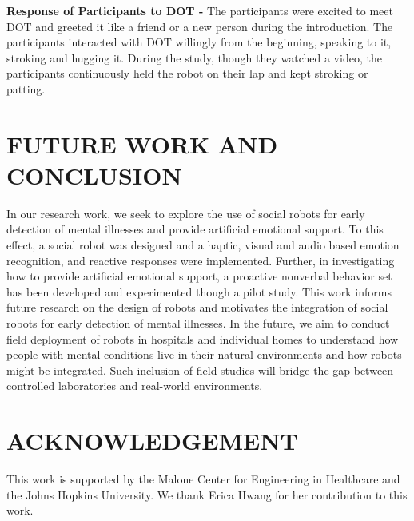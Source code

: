\documentclass[letterpaper, 10 pt, conference]{ieeeconf}  %
\begin{document}
\textbf{Response of Participants to DOT -} The participants were excited to meet DOT and greeted it like a friend or a new person during the introduction. The participants interacted with DOT willingly from the beginning, speaking to it, stroking and hugging it. During the study, though they watched a video, the participants continuously
held the robot on their lap and kept stroking or patting.

\section{FUTURE WORK AND CONCLUSION}

In our research work, we seek to explore the use of social robots for early detection of mental illnesses and provide artificial emotional support. To this effect, a social robot was designed and a haptic, visual and audio based emotion recognition, and reactive responses were implemented. Further, in investigating how to provide artificial emotional support, a proactive nonverbal behavior set has been developed and experimented though a pilot study. This work informs future research on the design of robots and motivates the integration of social robots for early detection of mental illnesses. In the future, we aim to conduct field deployment of robots in hospitals and individual homes to understand how people with mental conditions live in their natural environments and how robots might be integrated. Such inclusion of field studies will bridge the gap between controlled laboratories and real-world environments. 

\section{ACKNOWLEDGEMENT}
This work is supported by the Malone Center for Engineering in Healthcare and the Johns Hopkins University. We thank Erica Hwang for her contribution to this work.
\end{document}

